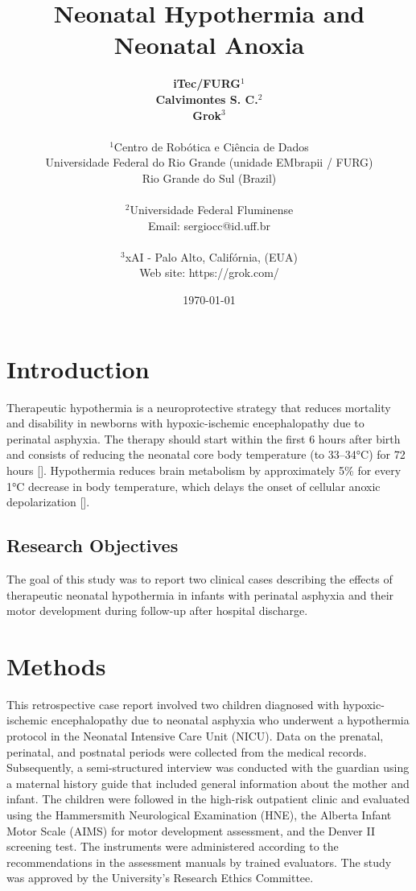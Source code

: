\documentclass[11pt,a4paper]{article}
\title{\textbf{Neonatal Hypothermia and Neonatal Anoxia}}
\author{
	\textbf{iTec/FURG}$^{1}$ \\
	\textbf{Calvimontes S. C.}$^{2}$ \\
	\textbf{Grok}$^{3}$ \\
	\\
	\small $^{1}$Centro de Robótica e Ciência de Dados \\
	\small Universidade Federal do Rio Grande (unidade EMbrapii / FURG) \\
	\small Rio Grande do Sul (Brazil) \\
	\\
	\small $^{2}$Universidade Federal Fluminense \\
	\small Email: sergiocc@id.uff.br \\
	\\
	\small $^{3}$xAI - Palo Alto, Califórnia, (EUA) \\
	\small Web site: https://grok.com/
}
\date{\today}
\begin{document}
	
	\maketitle
	
	\newpage
	
	\section{Introduction}
	Therapeutic hypothermia is a neuroprotective strategy that reduces mortality and disability in newborns with hypoxic-ischemic encephalopathy due to perinatal asphyxia. The therapy should start within the first 6 hours after birth and consists of reducing the neonatal core body temperature (to 33--34°C) for 72 hours [\cite{Azzopardi2014,Thayyil2021,Abate2021}]. Hypothermia reduces brain metabolism by approximately 5\% for every 1°C decrease in body temperature, which delays the onset of cellular anoxic depolarization [\cite{Silveira2015}].
		
	\subsection{Research Objectives}
	The goal of this study was to report two clinical cases describing the effects of therapeutic neonatal hypothermia in infants with perinatal asphyxia and their motor development during follow-up after hospital discharge.
	
	\section{Methods}
	This retrospective case report involved two children diagnosed with hypoxic-ischemic encephalopathy due to neonatal asphyxia who underwent a hypothermia protocol in the Neonatal Intensive Care Unit (NICU). Data on the prenatal, perinatal, and postnatal periods were collected from the medical records. Subsequently, a semi-structured interview was conducted with the guardian using a maternal history guide that included general information about the mother and infant. The children were followed in the high-risk outpatient clinic and evaluated using the Hammersmith Neurological Examination (HNE), the Alberta Infant Motor Scale (AIMS) for motor development assessment, and the Denver II screening test. The instruments were administered according to the recommendations in the assessment manuals by trained evaluators. The study was approved by the University's Research Ethics Committee.
	
\end{document}
